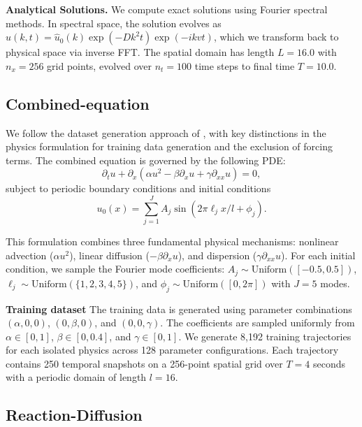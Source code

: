 \documentclass{article}
\theoremstyle{plain}
\theoremstyle{definition}
\theoremstyle{remark}
\begin{document}
\textbf{Analytical Solutions.} We compute exact solutions using Fourier spectral methods. In spectral space, the solution evolves as $\hat{u}(k,t) = \hat{u}_0(k) \exp(-Dk^2t) \exp(-ikvt)$, which we transform back to physical space via inverse FFT. The spatial domain has length $L = 16.0$ with $n_x = 256$ grid points, evolved over $n_t = 100$ time steps to final time $T = 10.0$.


\subsection{Combined-equation}

We follow the dataset generation approach of \cite{Brandstetter2022}, with key distinctions in the physics formulation for training data generation and the exclusion of forcing terms. The combined equation is governed by the following PDE:
\begin{equation}
\partial_t u + \partial_x (\alpha u^2 - \beta \partial_x u + \gamma \partial_{xx} u) = 0,
\end{equation}
subject to periodic boundary conditions and initial conditions
\begin{equation}
\label{equation:init}
u_0(x) = \sum_{j=1}^{J} A_j \sin(2\pi \ell_j x / l + \phi_j).
\end{equation}

This formulation combines three fundamental physical mechanisms: nonlinear advection ($\alpha u^2$), linear diffusion ($-\beta \partial_x u$), and dispersion ($\gamma \partial_{xx} u$). For each initial condition, we sample the Fourier mode coefficients: $A_j \sim \text{Uniform}([-0.5, 0.5])$, $\ell_j \sim \text{Uniform}(\{1, 2, 3, 4, 5\})$, and $\phi_j \sim \text{Uniform}([0, 2\pi])$ with $J=5$ modes.

\textbf{Training dataset} The training data is generated using parameter combinations $(\alpha, 0, 0)$, $(0, \beta, 0)$, and $(0, 0, \gamma)$. The coefficients are sampled uniformly from $\alpha \in [0, 1]$, $\beta \in [0, 0.4]$, and $\gamma \in [0, 1]$. We generate 8,192 training trajectories for each isolated physics across 128 parameter configurations. Each trajectory contains 250 temporal snapshots on a 256-point spatial grid over $T=4$ seconds with a periodic domain of length $l=16$.

\subsection{Reaction-Diffusion}
\end{document}
